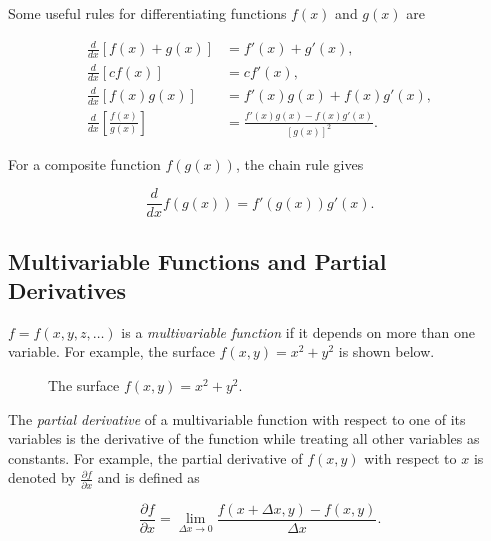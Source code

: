\documentclass[12pt]{article}
\begin{document}
Some useful rules for differentiating functions \(f(x)\) and \(g(x)\) are

\begin{align*}
\frac{d}{dx}[f(x)+g(x)]
&= f'(x)+g'(x), \\
\frac{d}{dx}[c f(x)]
&= c f'(x), \\
\frac{d}{dx}[f(x)g(x)]
&= f'(x)g(x)+f(x)g'(x), \\
\frac{d}{dx}\left[\frac{f(x)}{g(x)}\right]
&=
\frac{f'(x)g(x)-f(x)g'(x)}{[g(x)]^2}.
\end{align*}

For a composite function \(f(g(x))\), the chain rule gives

\[
\frac{d}{dx}f(g(x))
=
f'(g(x))g'(x).
\]

\subsection{Multivariable Functions and Partial Derivatives}
$f=f(x,y,z,\hdots)$ is a \emph{multivariable function} if it depends on more than one variable. For example, the surface $f(x,y)=x^2+y^2$ is shown below.

\begin{figure}[h]
\centering
{}
\caption{The surface $f(x,y)=x^2+y^2$.}
\end{figure}

The \emph{partial derivative} of a multivariable function with respect to one of its variables is the derivative of the function while treating all other variables as constants. For example, the partial derivative of \(f(x,y)\) with respect to \(x\) is denoted by \(\frac{\partial f}{\partial x}\) and is defined as

\[
\frac{\partial f}{\partial x}
=
\lim_{\Delta x \to 0}
\frac{f(x+\Delta x,y)-f(x,y)}{\Delta x}.
\]
\end{document}
